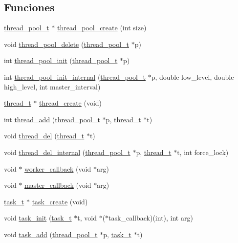 \subsection*{Funciones}
\begin{DoxyCompactItemize}
\item 
\hyperlink{structthread__pool__t}{thread\+\_\+pool\+\_\+t} $\ast$ \hyperlink{G-2313-06-P1__thread__pool_8c_ae4c7364510f378011559c4eb6078e3ea}{thread\+\_\+pool\+\_\+create} (int size)
\item 
void \hyperlink{G-2313-06-P1__thread__pool_8c_a46b14e66a9466a68fa4f67a2e08e81fd}{thread\+\_\+pool\+\_\+delete} (\hyperlink{structthread__pool__t}{thread\+\_\+pool\+\_\+t} $\ast$p)
\item 
int \hyperlink{G-2313-06-P1__thread__pool_8c_a46e84068eca615afa66b5544ea7a2518}{thread\+\_\+pool\+\_\+init} (\hyperlink{structthread__pool__t}{thread\+\_\+pool\+\_\+t} $\ast$p)
\item 
int \hyperlink{G-2313-06-P1__thread__pool_8c_ae2a8c98f4f014e5b9d632bb678d7127a}{thread\+\_\+pool\+\_\+init\+\_\+internal} (\hyperlink{structthread__pool__t}{thread\+\_\+pool\+\_\+t} $\ast$p, double low\+\_\+level, double high\+\_\+level, int master\+\_\+interval)
\item 
\hyperlink{structthread__t}{thread\+\_\+t} $\ast$ \hyperlink{G-2313-06-P1__thread__pool_8c_a920e51bce81dfc069372dd87935db55e}{thread\+\_\+create} (void)
\item 
int \hyperlink{G-2313-06-P1__thread__pool_8c_a9aa2b7b210972e06e1a7d0775ba520b3}{thread\+\_\+add} (\hyperlink{structthread__pool__t}{thread\+\_\+pool\+\_\+t} $\ast$p, \hyperlink{structthread__t}{thread\+\_\+t} $\ast$t)
\item 
void \hyperlink{G-2313-06-P1__thread__pool_8c_a95970a6ee2f49963fc3fe7aefa677194}{thread\+\_\+del} (\hyperlink{structthread__t}{thread\+\_\+t} $\ast$t)
\item 
void \hyperlink{G-2313-06-P1__thread__pool_8c_a1fe4c198a9a46014fbac70eb443018a1}{thread\+\_\+del\+\_\+internal} (\hyperlink{structthread__pool__t}{thread\+\_\+pool\+\_\+t} $\ast$p, \hyperlink{structthread__t}{thread\+\_\+t} $\ast$t, int force\+\_\+lock)
\item 
void $\ast$ \hyperlink{G-2313-06-P1__thread__pool_8c_a4ef081fb21acd34e0e2492a9f290b6a3}{worker\+\_\+callback} (void $\ast$arg)
\item 
void $\ast$ \hyperlink{G-2313-06-P1__thread__pool_8c_a54703c23462be974a5e2511247921922}{master\+\_\+callback} (void $\ast$arg)
\item 
\hyperlink{structtask__t}{task\+\_\+t} $\ast$ \hyperlink{G-2313-06-P1__thread__pool_8c_afa05870619a7e753d41b8135b8514a2c}{task\+\_\+create} (void)
\item 
void \hyperlink{G-2313-06-P1__thread__pool_8c_a5665a923c48ff85abd630ddf83eb9999}{task\+\_\+init} (\hyperlink{structtask__t}{task\+\_\+t} $\ast$t, void $\ast$($\ast$task\+\_\+callback)(int), int arg)
\item 
void \hyperlink{G-2313-06-P1__thread__pool_8c_a90a0cb9adb9500b4f205edd942fc8272}{task\+\_\+add} (\hyperlink{structthread__pool__t}{thread\+\_\+pool\+\_\+t} $\ast$p, \hyperlink{structtask__t}{task\+\_\+t} $\ast$t)
\end{DoxyCompactItemize}



